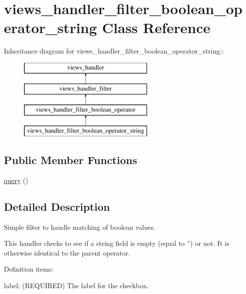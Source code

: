 \hypertarget{classviews__handler__filter__boolean__operator__string}{
\section{views\_\-handler\_\-filter\_\-boolean\_\-operator\_\-string Class Reference}
\label{classviews__handler__filter__boolean__operator__string}
}
Inheritance diagram for views\_\-handler\_\-filter\_\-boolean\_\-operator\_\-string::\begin{figure}[H]
\begin{center}
\leavevmode
\includegraphics[height=4cm]{classviews__handler__filter__boolean__operator__string}
\end{center}
\end{figure}
\subsection*{Public Member Functions}
\begin{DoxyCompactItemize}
\item 
\hyperlink{classviews__handler__filter__boolean__operator__string_ad4d0444476749372e38591ad058ee1cd}{query} ()
\end{DoxyCompactItemize}


\subsection{Detailed Description}
Simple filter to handle matching of boolean values.

This handler checks to see if a string field is empty (equal to '') or not. It is otherwise identical to the parent operator.

Definition items:
\begin{DoxyItemize}
\item label: (REQUIRED) The label for the checkbox. 
\end{DoxyItemize}

